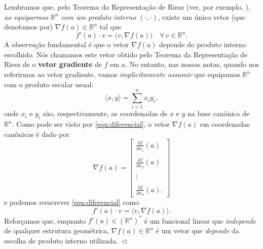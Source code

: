 \begin{obs}
	Lembramos que, pelo Teorema da Representação de Riesz (ver, por exemplo, \cite[Seção 8.5]{Buen-06}), \textit{ao equiparmos $\mathbb{R}^n$ com um produto interno} $(\cdot, \cdot)$, existe um único vetor (que denotamos por) $\nabla f(a) \in \mathbb{R}^n$ tal que
	\[
	f'(a) \cdot v = \big(v, \nabla f(a)\big) \quad \forall \, v \in \mathbb{R}^n.
	\] A observação fundamental é que o vetor $\nabla f(a)$ depende do produto interno escolhido. Nós chamamos este vetor obtido pelo Teorema da Representação de Riesz de o \textbf{vetor gradiente} de $f$ em $a$. No entanto, nas nossas notas, quando nos referirmos ao vetor gradiente, vamos \textit{implicitamente assumir} que equipamos $\mathbb{R}^n$ com o produto escalar usual:
	\[
	\langle x, y \rangle = \sum_{i=1}^{n} x_i y_i,
	\] onde $x_i$ e $y_i$ são, respectivamente, as coordenadas de $x$ e $y$ na base canônica de $\mathbb{R}^n$. Como pode ser visto por \eqref{eqn:diferencial}, o vetor $\nabla f(a)$ em coordenadas canônicas é dado por
	\[
	\nabla f (a) = \begin{bmatrix}
	\frac{\partial f}{\partial x_1}(a) \\ \\ \frac{\partial f}{\partial x_2}(a) \\ \\ \vdots \\ \\ \frac{\partial f}{\partial x_n}(a).
	\end{bmatrix}
	\] e podemos reescrever \eqref{eqn:diferencial} como
	\begin{equation}
	f'(a) \cdot v = \big\langle v, \nabla f (a) \big\rangle.
	\end{equation} Reforçamos que, enquanto $f'(a) \in (\mathbb{R}^n)^*$ é um funcional linear que \textit{independe} de qualquer estrutura geométrica, $\nabla f (a) \in \mathbb{R}^n$ é um vetor que \textit{depende} da escolha de produto interno utilizada$.  \ \lhd$ 
\end{obs}


